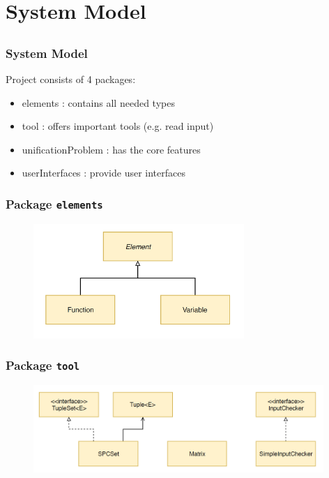 \section{System Model} \subsection{}
	
	\begin{frame}[fragile=singleslide]
	\frametitle{System Model}
	 
	Project consists of 4 packages:
		\begin{itemize}
			\item elements : contains all needed types
			\item tool : offers important tools (e.g. read input)
			\item unificationProblem : has the core features
			\item userInterfaces : provide user interfaces
		\end{itemize}
	
  \end{frame}	
		

	\begin{frame}[fragile=singleslide]
	\frametitle{Package \texttt{elements}}
	
	\begin{figure}
		\centering
			\includegraphics[width=8cm]{Bilder/elements.PNG}
		\label{fig:elements}
	\end{figure}
	
  \end{frame}	


	\begin{frame}[fragile=singleslide]
	\frametitle{Package \texttt{tool}}
	 
	\begin{figure}
		\centering
			\includegraphics[width=11cm]{Bilder/tool.PNG}
		\label{fig:tool}
	\end{figure}
	
  \end{frame}	

